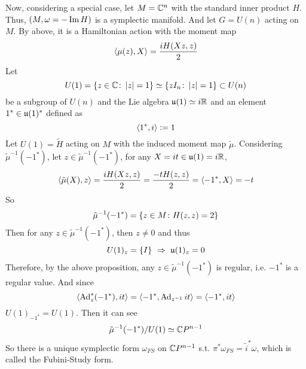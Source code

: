 \documentclass[a4paper,12pt]{article}
\begin{document}
	Now, considering a special case, let $M = \mathbb{C}^n$ with the standard inner product $H$. Thus, $(M,\omega = -\operatorname{Im} H)$ is a symplectic manifold. And let $G = U(n)$ acting on $M$. By above, it is a Hamiltonian action with the moment map
	\begin{equation*}
	 	\left\langle \mu(z),X \right\rangle = \frac{iH(Xz,z)}{2}
	\end{equation*} 
	Let
	\begin{equation*}
		U(1) = \left\{z \in \mathbb{C} \colon \left\lvert z\right\lvert = 1\right\} \simeq \left\{zI_n \colon \left\lvert z\right\lvert = 1\right\} \subset U(n)
	\end{equation*}
	be a subgroup of $U(n)$ and the Lie algebra $\mathfrak{u}(1) \simeq i\mathbb{R}$ and an element $1^{*} \in \mathfrak{u}(1)^*$ defined as
	\begin{equation*}
		\left\langle 1^*,i \right\rangle \vcentcolon= 1
	\end{equation*}
	Let $U(1)=\tilde{H}$ acting on $M$ with the induced moment map $\tilde{\mu}$. Considering $\tilde{\mu}^{-1}(-1^*)$, let $z \in \tilde{\mu}^{-1}(-1^*)$, for any $X = it \in \mathfrak{u}(1) = i\mathbb{R}$,
	\begin{equation*}
		\left\langle \tilde{\mu}(X),z \right\rangle = \frac{iH(Xz,z)}{2} = \frac{-tH(z,z)}{2} = \left\langle -1^*,X \right\rangle = -t
	\end{equation*}
	So
	\begin{equation*}
		\tilde{\mu}^{-1}(-1^*) = \left\{z \in M \colon H(z,z) = 2\right\}
	\end{equation*}
	Then for any  $z \in \tilde{\mu}^{-1}(-1^*)$, then $z \neq 0$ and thus
	\begin{equation*}
		U(1)_z = \{I\}~\Rightarrow~ \mathfrak{u}(1)_z = 0
	\end{equation*}
	Therefore, by the above proposition, any $z\in \tilde{\mu}^{-1}(-1^*)$ is regular, i.e. $-1^*$ is a regular value. And since
	\begin{equation*}
		\left\langle \operatorname{Ad}_{z}^*(-1^*),it \right\rangle  = \left\langle -1^*,\operatorname{Ad}_{z^{-1}}it \right\rangle = \left\langle -1^*,it \right\rangle
	\end{equation*}
	$U(1)_{-1^*}  =  U(1)$. Then it can see
	\begin{equation*}
		\tilde{\mu}^{-1}(-1^*) / U(1) \simeq \mathbb{C} P^{n-1}
	\end{equation*}
	So there is a unique symplectic form $\omega_{FS}$ on $\mathbb{C} P^{n-1}$ s.t. $\pi^*\omega_{FS} = \tilde{i}^* \omega$, which is called the Fubini-Study form.
\end{document}
